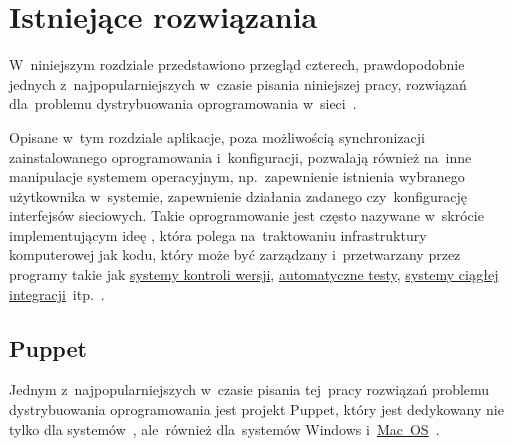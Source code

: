 \documentclass[thesis]{subfiles}
\begin{document}

\chapter{Istniejące rozwiązania}
\label{ch:istniejace-rozwiazania}

W~niniejszym rozdziale przedstawiono przegląd czterech, prawdopodobnie jednych z~najpopularniejszych w~czasie pisania niniejszej pracy, rozwiązań dla~problemu dystrybuowania oprogramowania w~sieci~\cite{leading-scms,wiki:scm-comparison}.

Opisane w~tym rozdziale aplikacje, poza możliwością synchronizacji zainstalowanego oprogramowania i~konfiguracji, pozwalają również na~inne manipulacje systemem operacyjnym, np.~zapewnienie istnienia wybranego użytkownika w~systemie, zapewnienie działania zadanego  czy~konfigurację interfejsów sieciowych. Takie oprogramowanie jest często nazywane w~skrócie~ implementującym ideę , która polega na~traktowaniu infrastruktury komputerowej jak kodu, który może być zarządzany i~przetwarzany przez programy takie jak \href{https://en.wikipedia.org/wiki/Version_control}{systemy kontroli wersji}, \href{https://en.wikipedia.org/wiki/Test_automation}{automatyczne testy}, \href{https://en.wikipedia.org/wiki/Comparison_of_continuous_integration_software}{systemy ciągłej integracji}~itp.~\cite{puppet-iac,wiki:iac,wiki:scm}.


\section{Puppet}
\label{sec:puppet}

Jednym z~najpopularniejszych w~czasie pisania tej~pracy rozwiązań problemu dystrybuowania oprogramowania jest projekt Puppet, który jest dedykowany nie tylko dla systemów~, ale~również dla~systemów Windows i~\href{https://en.wikipedia.org/wiki/MacOS}{Mac~OS}~\cite{puppet,puppet-github,puppet-clients}.
\end{document}
